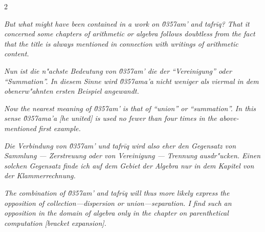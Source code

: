 \documentclass[10pt,a4paper]{article}
\newcommand{\enquote}[1]{``#1''}
\begin{document}
\begin{paracol}{2}
\switchcolumn

\textit{But what might have been contained in a work on \textit{\u0357{}am'} and \textit{tafr\={i}q}? That it concerned some chapters of arithmetic or algebra follows doubtless from the fact that the title is always mentioned in connection with writings of arithmetic content.}

\switchcolumn*

\textit{Nun ist die n"achste Bedeutung von \textit{\u0357{}am'} die der \enquote{Vereinigung} oder \enquote{Summation}. In diesem Sinne wird \textit{\u0357{}ama'a} nicht weniger als viermal in dem obenerw"ahnten ersten Beispiel angewandt.}

\switchcolumn

\textit{Now the nearest meaning of \textit{\u0357{}am'} is that of \enquote{union} or \enquote{summation}. In this sense \textit{\u0357{}ama'a} [he united] is used no fewer than four times in the above-mentioned first example.}

\switchcolumn*

\textit{Die Verbindung von \textit{\u0357{}am'} und \textit{tafr\={i}q} wird also eher den Gegensatz von Sammlung --- Zerstreuung oder von Vereinigung --- Trennung ausdr"ucken. Einen solchen Gegensatz finde ich auf dem Gebiet der Algebra nur in dem Kapitel von der Klammerrechnung.}

\switchcolumn

\textit{The combination of \textit{\u0357{}am'} and \textit{tafr\={i}q} will thus more likely express the opposition of collection---dispersion or union---separation. I find such an opposition in the domain of algebra only in the chapter on parenthetical computation [bracket expansion].}

\end{paracol}

\clearpage
\end{document}
